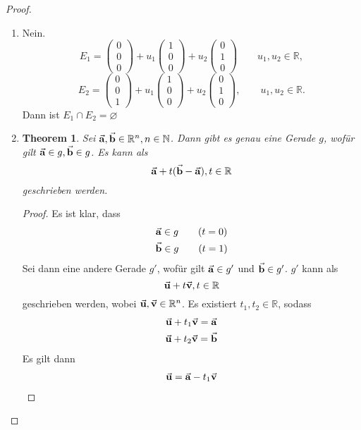 \documentclass[prb,12pt]{revtex4-2}
\newtheorem{Theorem}{Theorem}
\theoremstyle{definition}
\theoremstyle{definition}
\newenvironment{parts}{\begin{enumerate}[label=(\alph*)]}{\end{enumerate}}
\newcommand{\N}{\mathbb{N}}
\newcommand{\R}{\mathbb{R}}
\begin{document}
\begin{proof}
\begin{parts}
		\item Nein.
		\[
		E_1=\begin{pmatrix} 0 \\ 0 \\ 0 \end{pmatrix} +u_1 \begin{pmatrix} 1 \\ 0 \\ 0 \end{pmatrix} +u_2 \begin{pmatrix} 0 \\ 1 \\ 0 \end{pmatrix} \qquad u_1,u_2\in \R
		,\] 
		\[
		E_2=\begin{pmatrix} 0 \\ 0 \\ 1 \end{pmatrix} +u_1\begin{pmatrix} 1 \\ 0 \\ 0 \end{pmatrix}+u_2\begin{pmatrix} 0 \\ 1 \\ 0 \end{pmatrix}, \qquad u_1,u_2\in \R
		.\]
		Dann ist $E_1\cap E_2=\varnothing$
	\item 
		\begin{Theorem}
			Sei $\va a, \va b\in \R^n, n\in \N$. Dann gibt es genau eine Gerade $g$, wof\"{u}r gilt $\va a \in g, \va b \in g$. Es kann als
			\[
			\va a+t(\va b-\va a), t\in \R
			\] 
			geschrieben werden.
		\end{Theorem}
		\begin{proof}
			Es ist klar, dass
			\begin{gather*}
				\va a\in g\qquad(t=0)\\
				\va b\in g\qquad(t=1)
			\end{gather*}
			Sei dann eine andere Gerade $g'$, wof\"{u}r gilt $\va a\in g'$ und $\va b\in g'$. $g'$ kann als
			\[
			\va u+t\va v, t\in \R
			\]
			geschrieben werden, wobei $\va u, \va v\in\R^n$. Es existiert $t_1,t_2\in\R$, sodass
			\begin{gather*}
				\va u+t_1\va v=\va a\\
				\va u+t_2\va v=\va b
			\end{gather*}
			Es gilt dann
			\begin{gather*}
				\va u=\va a-t_1\va v\\

\end{gather*}
\end{proof}
\end{parts}
\end{proof}
\end{document}

